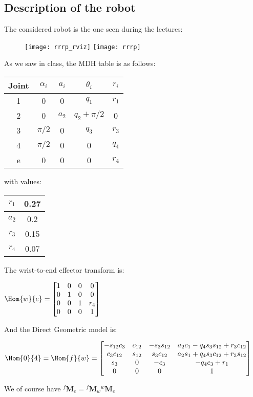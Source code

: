 \documentclass{ecnreport}
\begin{document}

\subsection*{Description of the robot}

The considered robot is the one seen during the lectures:
\begin{figure}[h!]\centering
\texttt{[image: rrrp\_rviz]} \quad
\texttt{[image: rrrp]}   
\end{figure}

As we saw in class, the MDH table is as follows:
\begin{center}
\begin{tabular}{|c|c|c|c|c|}\hline
        Joint & $\alpha_i$ & $a_i$ &  $\theta_i$ & $r_i$\\\hline 
        1 & 0 & 0 & $q_1$ & $r_1$ \\\hline
        2 & 0& $a_2$  & $q_2+\pi/2$ & 0\\\hline
        3 & $\pi/2$ & 0 & $q_3$ & $r_3$\\\hline
        4 & $\pi/2$ & 0 & 0 & $q_4$\\\hline
        e & 0 & 0 & 0 & $r_4$\\\hline
    \end{tabular}
    with values: \begin{tabular}{|c|c|}\hline		
        $r_1$ & 0.27\\\hline
        $a_2$ & 0.2\\\hline
        $r_3$ & 0.15\\\hline
        $r_4$ & 0.07\\\hline
    \end{tabular}
\end{center}

The wrist-to-end effector transform is:
\begin{center}
$\Hom{w}{e} = \left[\begin{matrix}1 & 0 & 0 & 0\\
0 & 1 & 0 & 0\\0 & 0 & 1 & r_4\\0 & 0 & 0 & 1\end{matrix}\right]$
\end{center}

And the Direct Geometric model is:
\begin{center}
$\Hom{0}{4} = \Hom{f}{w} = \left[\begin{matrix}- s_{12} c_3 & c_{12} & - s_3 s_{12} & a_{2} c_1 - q_{4} s_3 s_{12} + r_{3} c_{12}\\c_3 c_{12} & s_{12} & s_3 c_{12} & a_{2} s_1 + q_{4} s_3 c_{12} + r_{3} s_{12}\\s_3 & 0 & - c_3 & - q_{4} c_3 + r_{1}\\0 & 0 & 0 & 1\end{matrix}\right]$
    \end{center}
    We of course have ${}^f\mathbf{M}_e = {}^f\mathbf{M}_w{}^w\mathbf{M}_e$
\end{document}
